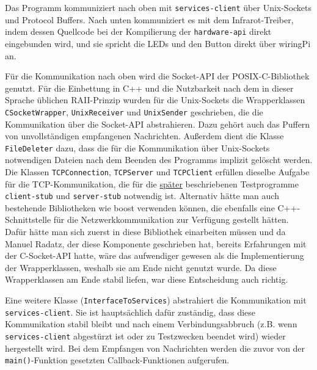 Das Programm kommuniziert nach oben mit \texttt{services-client} über Unix-Sockets und Protocol
Buffers.
Nach unten kommuniziert es mit dem Infrarot-Treiber, indem dessen Quellcode bei der Kompilierung
der \texttt{hardware-api} direkt eingebunden wird, und sie spricht die LEDs und den Button direkt
über wiringPi an.

Für die Kommunikation nach oben wird die Socket-API der POSIX-C-Bibliothek genutzt.
Für die Einbettung in C++ und die Nutzbarkeit nach dem in dieser Sprache üblichen RAII-Prinzip
wurden für die Unix-Sockets die Wrapperklassen \texttt{CSocketWrapper}, \texttt{UnixReceiver} und
\texttt{UnixSender} geschrieben, die die Kommunikation über die Socket-API abstrahieren.
Dazu gehört auch das Puffern von unvollständigen empfangenen Nachrichten.
Außerdem dient die Klasse \texttt{FileDeleter} dazu, dass die für die Kommunikation über
Unix-Sockets notwendigen Dateien nach dem Beenden des Programms implizit gelöscht werden.
Die Klassen \texttt{TCPConnection}, \texttt{TCPServer} und \texttt{TCPClient} erfüllen dieselbe
Aufgabe für die TCP-Kommunikation, die für die \hyperref[client-stub-und-server-stub]{später}
beschriebenen Testprogramme \texttt{client-stub} und \texttt{server-stub} notwendig ist.
Alternativ hätte man auch bestehende Bibliotheken wie boost verwenden können, die ebenfalls eine
C++-Schnittstelle für die Netzwerkkommunikation zur Verfügung gestellt hätten.
Dafür hätte man sich zuerst in diese Bibliothek einarbeiten müssen und da Manuel Radatz, der diese
Komponente geschrieben hat, bereits Erfahrungen mit der C-Socket-API hatte, wäre das aufwendiger
gewesen als die Implementierung der Wrapperklassen, weshalb sie am Ende nicht genutzt wurde.
Da diese Wrapperklassen am Ende stabil liefen, war diese Entscheidung auch richtig.

Eine weitere Klasse (\texttt{InterfaceToServices}) abstrahiert die Kommunikation mit
\texttt{services-client}.
Sie ist hauptsächlich dafür zuständig, dass diese Kommunikation stabil bleibt und nach einem
Verbindungsabbruch (z.B. wenn \texttt{services-client} abgestürzt ist oder zu Testzwecken beendet
wird) wieder hergestellt wird.
Bei dem Empfangen von Nachrichten werden die zuvor von der \texttt{main()}-Funktion gesetzten
Callback-Funktionen aufgerufen.

